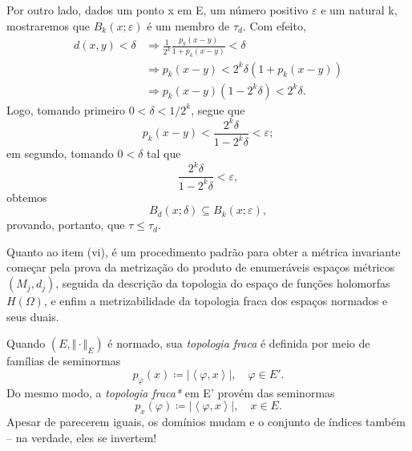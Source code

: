 \documentclass[../distribution_theory_notes.tex]{subfiles}
\begin{document}
\begin{proof*}
	Por outro lado, dados um ponto x em E, um número positivo \(\varepsilon \) e um natural k, mostraremos que \(B_{k}(x; \varepsilon )\) é um membro de \(\tau_{d}\). Com efeito,
	\begin{align*}
		d(x, y)<\delta & \Rightarrow \frac{1}{2^{k}}\frac{p_{k}(x-y)}{1+p_{k}(x-y)}<\delta \\
		               & \Rightarrow p_{k}(x-y)<2^{k}\delta (1+p_{k}(x-y))                 \\
		               & \Rightarrow p_{k}(x-y)(1-2^{k}\delta )<2^{k}\delta .
	\end{align*}
	Logo, tomando primeiro \(0<\delta <1/2^{k}\), segue que
	\[
		p_{k}(x-y)<\frac{2^{k}\delta }{1-2^{k}\delta }<\varepsilon;
	\]
	em segundo, tomando \(0<\delta \) tal que
	\[
		\frac{2^{k}\delta }{1-2^{k}\delta }<\varepsilon ,
	\]
	obtemos
	\[
		B_{d}(x; \delta )\subseteq B_{k}(x; \varepsilon ),
	\]
	provando, portanto, que \(\tau \leq \tau_{d}\). \qedsymbol

\end{proof*}
\begin{tcolorbox}[
		skin=enhanced,
		title=Observação,
		fonttitle=\bfseries,
		colframe=black,
		colbacktitle=cyan!75!white,
		colback=cyan!15,
		colbacklower=black,
		coltitle=black,
		drop fuzzy shadow,
	]
	Quanto ao item (vi), é um procedimento padrão para obter a métrica invariante começar pela prova da metrização do produto de enumeráveis espaços métricos \((M_{j}, d_{j})\), seguida da descrição da topologia do espaço de funções holomorfas \(H(\Omega )\), e enfim a metrizabilidade da topologia fraca dos espaços normados e seus duais.
\end{tcolorbox}

\begin{example}
	Quando \((E, \Vert \cdot  \Vert_{E})\) é normado, sua \textit{topologia fraca} é definida por meio de famílias de seminormas
	\[
		p_{\varphi }(x)\coloneqq |\left< \varphi , x \right>|,\quad \varphi \in E'.
	\]
	Do mesmo modo, a \textit{topologia fraca*} em E' provém das seminormas
	\[
		p_{x}(\varphi )\coloneqq |\left< \varphi , x \right>|,\quad x\in E.
	\]
	Apesar de parecerem iguais, os domínios mudam e o conjunto de índices também -- na verdade, eles se invertem!
\end{example}
\end{document}
